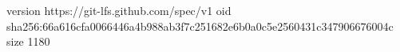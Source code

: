 version https://git-lfs.github.com/spec/v1
oid sha256:66a616cfa0066446a4b988ab3f7c251682e6b0a0c5e2560431c347906676004c
size 1180

